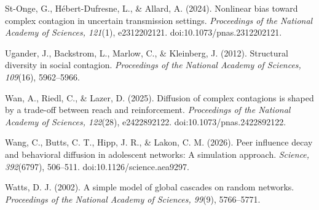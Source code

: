 \documentclass[11pt]{article}
\begin{document}
\begin{flushleft}
\noindent\hangindent=0.5in 

St-Onge, G., Hébert-Dufresne, L., \& Allard, A. (2024). Nonlinear bias toward complex contagion in uncertain transmission settings. \textit{Proceedings of the National Academy of Sciences, 121}(1), e2312202121. doi:10.1073/pnas.2312202121.

\noindent\hangindent=0.5in 

Ugander, J., Backstrom, L., Marlow, C., \& Kleinberg, J. (2012). Structural diversity in social contagion. \textit{Proceedings of the National Academy of Sciences, 109}(16), 5962–5966.

\noindent\hangindent=0.5in 

Wan, A., Riedl, C., \& Lazer, D. (2025). Diffusion of complex contagions is shaped by a trade-off between reach and reinforcement. \textit{Proceedings of the National Academy of Sciences, 122}(28), e2422892122. doi:10.1073/pnas.2422892122.

\noindent\hangindent=0.5in 

Wang, C., Butts, C. T., Hipp, J. R., \& Lakon, C. M. (2026). Peer influence decay and behavioral diffusion in adolescent networks: A simulation approach. \textit{Science, 392}(6797), 506–511. doi:10.1126/science.aea9297.

\noindent\hangindent=0.5in 

Watts, D. J. (2002). A simple model of global cascades on random networks. \textit{Proceedings of the National Academy of Sciences, 99}(9), 5766–5771.
\end{flushleft}
\end{document}
